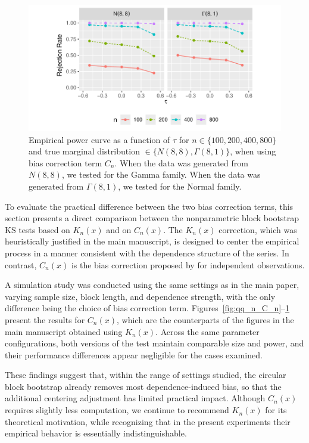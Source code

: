 \documentclass[12pt]{article}
\begin{document}
\begin{figure}[tbp]
  \centering
  \includegraphics[scale=1]{figures/rr_C_n}
  \caption{Empirical power curve as a function of $\tau$ for
    $n \in \{100, 200, 400, 800\}$ and true marginal distribution
    $\in \{N(8,8), \Gamma(8,1)\}$, when using bias correction term
    $C_n$. When the data was generated from $N(8,8)$,
    we tested for the Gamma family. When the data was generated from
    $\Gamma(8,1)$, we tested for the Normal family.
  }
  \label{fig:rr_C_n}
\end{figure}


To evaluate the practical difference between the two bias correction
terms, this section presents a direct comparison between the
nonparametric block bootstrap KS tests based on $K_n(x)$ and on
$C_n(x)$. The $K_n(x)$ correction, which was heuristically justified in
the main manuscript, is designed to center the empirical process in a
manner consistent with the dependence structure of the series. In
contrast, $C_n(x)$ is the bias correction proposed by
\citet{babu2004goodness} for independent observations.


A simulation study was conducted using the same settings as in the main
paper, varying sample size, block length, and dependence strength, with
the only difference being the choice of bias correction term.
Figures~\ref{fig:qq_n_C_n}--\ref{fig:rr_C_n} present the results for
$C_n(x)$, which are the counterparts of the figures in the main
manuscript obtained
using $K_n(x)$. Across the same parameter configurations, both versions
of the test maintain comparable size and power, and their performance
differences appear negligible for the cases examined.


These findings suggest that, within the range of settings studied, the
circular block bootstrap already removes most dependence-induced bias,
so that the additional centering adjustment has limited practical
impact. Although $C_n(x)$ requires slightly less computation, we
continue to recommend $K_n(x)$ for its theoretical motivation, while
recognizing that in the present experiments their empirical behavior is
essentially indistinguishable.
\end{document}
